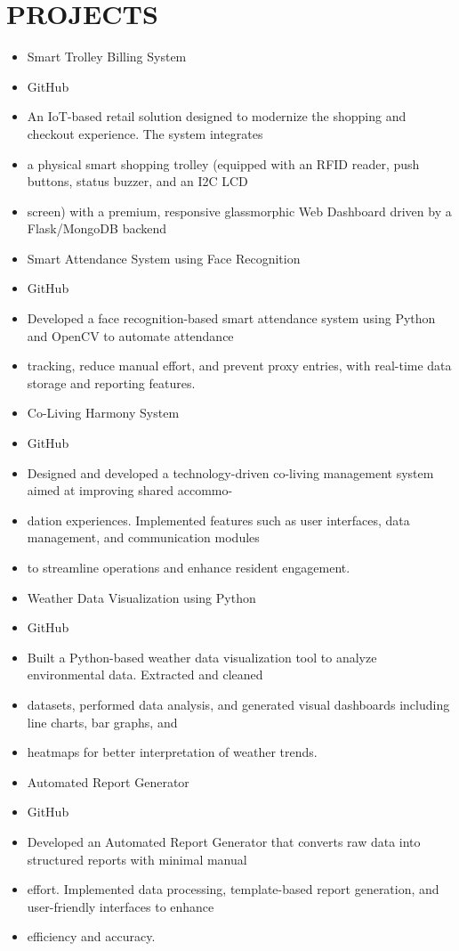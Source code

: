 \documentclass[10pt,a4paper]{article}
\begin{document}
\section*{PROJECTS}
\begin{itemize}[leftmargin=*]
    \item Smart Trolley Billing System
    \item GitHub
    \item An IoT-based retail solution designed to modernize the shopping and checkout experience. The system integrates
    \item a physical smart shopping trolley (equipped with an RFID reader, push buttons, status buzzer, and an I2C LCD
    \item screen) with a premium, responsive glassmorphic Web Dashboard driven by a Flask/MongoDB backend
    \item Smart Attendance System using Face Recognition
    \item GitHub
    \item Developed a face recognition-based smart attendance system using Python and OpenCV to automate attendance
    \item tracking, reduce manual effort, and prevent proxy entries, with real-time data storage and reporting features.
    \item Co-Living Harmony System
    \item GitHub
    \item Designed and developed a technology-driven co-living management system aimed at improving shared accommo-
    \item dation experiences. Implemented features such as user interfaces, data management, and communication modules
    \item to streamline operations and enhance resident engagement.
    \item Weather Data Visualization using Python
    \item GitHub
    \item Built a Python-based weather data visualization tool to analyze environmental data. Extracted and cleaned
    \item datasets, performed data analysis, and generated visual dashboards including line charts, bar graphs, and
    \item heatmaps for better interpretation of weather trends.
    \item Automated Report Generator
    \item GitHub
    \item Developed an Automated Report Generator that converts raw data into structured reports with minimal manual
    \item effort. Implemented data processing, template-based report generation, and user-friendly interfaces to enhance
    \item efficiency and accuracy.
\end{itemize}
\end{document}

